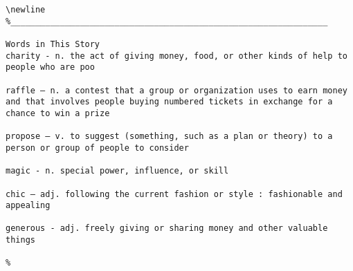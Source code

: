 \begin{lstlisting}[]
\newline
%________________________________________________________________

Words in This Story
charity - n. the act of giving money, food, or other kinds of help to people who are poo

raffle – n. a contest that a group or organization uses to earn money and that involves people buying numbered tickets in exchange for a chance to win a prize

propose – v. to suggest (something, such as a plan or theory) to a person or group of people to consider

magic - n. special power, influence, or skill

chic – adj. following the current fashion or style : fashionable and appealing

generous - adj. freely giving or sharing money and other valuable things

%
\end{lstlisting}
